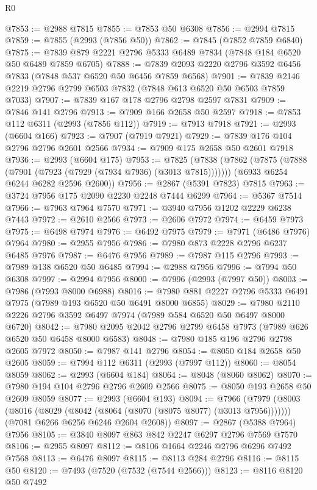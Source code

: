 \begin{lexlean}{R0}
\begin{coremodule}
@7853 := @2988 @7815
@7855 := @7853 @50 @6308
@7856 := @2994 @7815
@7859 := @7855 (@2993 (@7856 @50))
@7862 := @7845 (@7852 @7859 @6840)
@7875 := @7839 @879 @2221 @2796 @5333 @6489 @7834 (@7848 @184 @6520 @50 @6489 @7859 @6705)
@7888 := @7839 @2093 @2220 @2796 @3592 @6456 @7833 (@7848 @537 @6520 @50 @6456 @7859 @6568)
@7901 := @7839 @2146 @2219 @2796 @2799 @6503 @7832 (@7848 @613 @6520 @50 @6503 @7859 @7033)
@7907 := @7839 @167 @178 @2796 @2798 @2597 @7831
@7909 := @7846 @141 @2796
@7913 := @7909 @166 @2658 @50 @2597
@7918 := @7853 @112 @6311 (@2993 (@7856 @112))
@7919 := @7913 @7918
@7921 := @2993 (@6604 @166)
@7923 := @7907 (@7919 @7921)
@7929 := @7839 @176 @104 @2796 @2796 @2601 @2566
@7934 := @7909 @175 @2658 @50 @2601 @7918
@7936 := @2993 (@6604 @175)
@7953 := @7825
    (@7838
      (@7862 (@7875 (@7888 (@7901 (@7923 (@7929 (@7934 @7936) (@3013 @7815)))))))
      (@6933 @6254 @6244 @6282 @2596 @2600))
@7956 := @2867 (@5391 @7823) @7815
@7963 := @3724 @7956 @175 @2090 @2230 @2248 @7444 @6299
@7964 := @5367 @7514
@7966 := @7963 @7964 @7570
@7971 := @3940 @7956 @1202 @2229 @6238 @7443
@7972 := @2610 @2566
@7973 := @2606 @7972
@7974 := @6459 @7973
@7975 := @6498 @7974
@7976 := @6492 @7975
@7979 := @7971 (@6486 @7976) @7964
@7980 := @2955 @7956
@7986 := @7980 @873 @2228 @2796 @6237 @6485 @7976
@7987 := @6476 @7956
@7989 := @7987 @115 @2796
@7993 := @7989 @138 @6520 @50 @6485
@7994 := @2988 @7956
@7996 := @7994 @50 @6308
@7997 := @2994 @7956
@8000 := @7996 (@2993 (@7997 @50))
@8003 := @7986 (@7993 @8000 @6988)
@8016 := @7980 @881 @2227 @2796 @5333 @6491 @7975 (@7989 @193 @6520 @50 @6491 @8000 @6855)
@8029 := @7980 @2110 @2226 @2796 @3592 @6497 @7974 (@7989 @584 @6520 @50 @6497 @8000 @6720)
@8042 := @7980 @2095 @2042 @2796 @2799 @6458 @7973 (@7989 @626 @6520 @50 @6458 @8000 @6583)
@8048 := @7980 @185 @196 @2796 @2798 @2605 @7972
@8050 := @7987 @141 @2796
@8054 := @8050 @184 @2658 @50 @2605
@8059 := @7994 @112 @6311 (@2993 (@7997 @112))
@8060 := @8054 @8059
@8062 := @2993 (@6604 @184)
@8064 := @8048 (@8060 @8062)
@8070 := @7980 @194 @104 @2796 @2796 @2609 @2566
@8075 := @8050 @193 @2658 @50 @2609 @8059
@8077 := @2993 (@6604 @193)
@8094 := @7966
    (@7979
      (@8003 (@8016 (@8029 (@8042 (@8064 (@8070 (@8075 @8077) (@3013 @7956)))))))
      (@7081 @6266 @6256 @6246 @2604 @2608))
@8097 := @2867 (@5388 @7964) @7956
@8105 := @3840 @8097 @863 @842 @2247 @6297 @2796 @7569 @7570
@8106 := @2955 @8097
@8112 := @8106 @1664 @2246 @2796 @6296 @7492 @7568
@8113 := @6476 @8097
@8115 := @8113 @284 @2796
@8116 := @8115 @50
@8120 := @7493 (@7520 (@7532 (@7544 @2566)))
@8123 := @8116 @8120 @50 @7492

\end{coremodule}
\end{lexlean}
